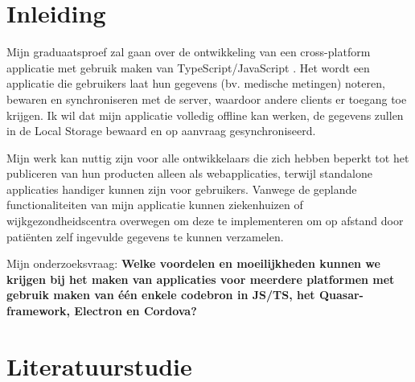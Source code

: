 


% 

\section{Inleiding}%
\label{sec:inleiding}

Mijn graduaatsproef zal gaan over de ontwikkeling van een cross-platform applicatie met gebruik maken van TypeScript/JavaScript \autocite{TSDoc}. Het wordt een applicatie die gebruikers laat hun gegevens (bv. medische metingen) noteren, bewaren en synchroniseren met de server, waardoor andere clients er toegang toe krijgen. Ik wil dat mijn applicatie volledig offline kan werken, de gegevens zullen in de Local Storage \autocite{MozillaLocalStorage} bewaard en op aanvraag gesynchroniseerd.

Mijn werk kan nuttig zijn voor alle ontwikkelaars die zich hebben beperkt tot het publiceren van hun producten alleen als webapplicaties, terwijl standalone applicaties handiger kunnen zijn voor gebruikers. Vanwege de geplande functionaliteiten van mijn applicatie kunnen ziekenhuizen of wijkgezondheidscentra overwegen om deze te implementeren om op afstand door patiënten zelf ingevulde gegevens te kunnen verzamelen.

Mijn onderzoeksvraag:
\textbf{Welke voordelen en moeilijkheden kunnen we krijgen bij het maken van applicaties voor meerdere platformen met gebruik maken van één enkele codebron in JS/TS, het Quasar-framework, Electron en Cordova? }


\section{Literatuurstudie}%
\label{sec:literatuurstudie}

